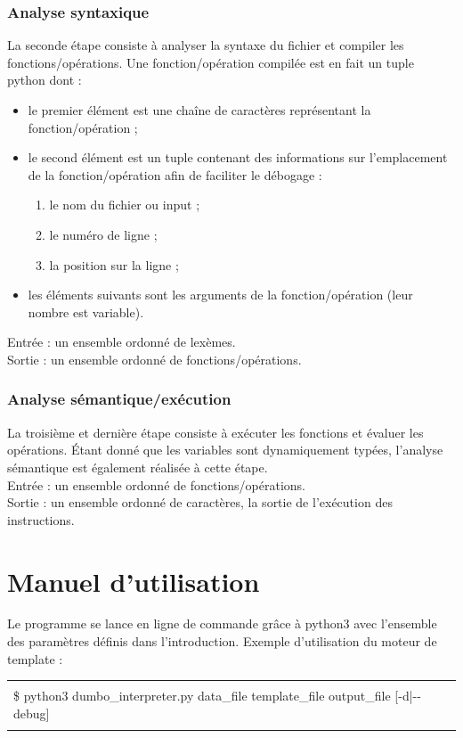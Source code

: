 \documentclass[10pt,a4paper]{article}
\begin{document}
	\subsubsection{Analyse syntaxique}
	La seconde étape consiste à analyser la syntaxe du fichier et compiler les fonctions/opérations.
	Une fonction/opération compilée est en fait un tuple python dont :
	\begin{itemize}
		\item le premier élément est une chaîne de caractères représentant la fonction/opération ;
		\item le second élément est un tuple contenant des informations sur l'emplacement de la fonction/opération afin de faciliter le débogage :
		\begin{enumerate}
			\item le nom du fichier ou input ;
			\item le numéro de ligne ;
			\item la position sur la ligne ;
		\end{enumerate}
		\item les éléments suivants sont les arguments de la fonction/opération (leur nombre est variable).
	\end{itemize}
	Entrée : un ensemble ordonné de lexèmes.\\
	Sortie : un ensemble ordonné de fonctions/opérations.
	
	\subsubsection{Analyse sémantique/exécution}
	La troisième et dernière étape consiste à exécuter les fonctions et évaluer les opérations.
	Étant donné que les variables sont dynamiquement typées, l'analyse sémantique est également réalisée à cette étape.\\
	Entrée : un ensemble ordonné de fonctions/opérations.\\
	Sortie : un ensemble ordonné de caractères, la sortie de l'exécution des instructions.
	
	\newpage
	\section{Manuel d'utilisation}
	Le programme se lance en ligne de commande grâce à python3 avec l'ensemble des paramètres définis dans l'introduction. Exemple d'utilisation du moteur de template :
	
	\begin{center}
	\begin{tabular}{|l|}
		\hline \\
		\$ python3 dumbo\_interpreter.py data\_file template\_file output\_file [-d|-{}-debug]\\
		\\
		\hline
	\end{tabular}
	\end{center}
	
\end{document}
